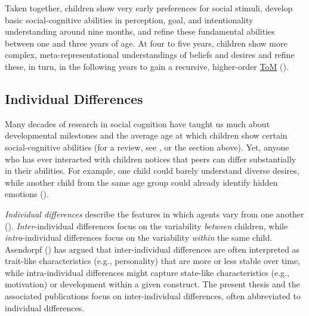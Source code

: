 \documentclass[
]{scrbook}
\begin{document}
Taken together, children show very early preferences for social stimuli, develop basic social-cognitive abilities in perception, goal, and intentionality understanding around nine months, and refine these fundamental abilities between one and three years of age. At four to five years, children show more complex, meta-representational understandings of beliefs and desires and refine these, in turn, in the following years to gain a recursive, higher-order \hyperref[acronyms_ToM]{ToM} ().

\subsection{Individual Differences}\label{individual-differences}

Many decades of research in social cognition have taught us much about developmental milestones and the average age at which children show certain social-cognitive abilities (for a review, see , or the section above). Yet, anyone who has ever interacted with children notices that peers can differ substantially in their abilities. For example, one child could barely understand diverse desires, while another child from the same age group could already identify hidden emotions ().

\emph{Individual differences} describe the features in which agents vary from one another (). \emph{Inter}-individual differences focus on the variability \emph{between} children, while \emph{intra}-individual differences focus on the variability \emph{within} the same child. Asendorpf () has argued that inter-individual differences are often interpreted as trait-like characteristics (e.g., personality) that are more or less stable over time, while intra-individual differences might capture state-like characteristics (e.g., motivation) or development within a given construct. The present thesis and the associated publications focus on inter-individual differences, often abbreviated to individual differences.
\end{document}
